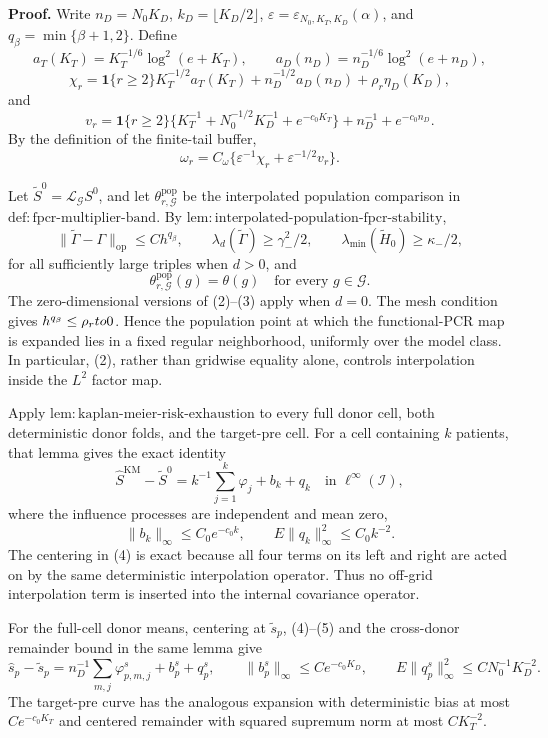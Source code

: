 \textbf{Proof.}
Write \(n_D=N_0K_D\), \(k_D=\lfloor K_D/2\rfloor\),
\(\varepsilon=\varepsilon_{N_0,K_T,K_D}(\alpha)\), and
\(q_\beta=\min\{\beta+1,2\}\).  Define
\[
 a_T(K_T)=K_T^{-1/6}\log^2(e+K_T),
 \qquad
 a_D(n_D)=n_D^{-1/6}\log^2(e+n_D),
\]
\[
 \chi_r=\mathbf 1\{r\ge2\}K_T^{-1/2}a_T(K_T)
       +n_D^{-1/2}a_D(n_D)+\rho_r\eta_D(K_D),
\]
and
\[
 v_r=\mathbf 1\{r\ge2\}
 \{K_T^{-1}+N_0^{-1/2}K_D^{-1}+e^{-c_0K_T}\}
 +n_D^{-1}+e^{-c_0n_D}.
\]
By the definition of the finite-tail buffer,
\[
 \omega_r=C_\omega\{\varepsilon^{-1}\chi_r
                   +\varepsilon^{-1/2}v_r\}.                 \tag{1}
\]

Let \(\widetilde S^0=\mathcal L_{\mathcal G}S^0\), and let
\(\theta^{\mathrm{pop}}_{r,\mathcal G}\) be the interpolated population
comparison in \(\mathrm{def:fpcr\mbox{-}multiplier\mbox{-}band}\).  By
\(\mathrm{lem:interpolated\mbox{-}population\mbox{-}fpcr\mbox{-}stability}\),
\[
 \|\widetilde\Gamma-\Gamma\|_{\mathrm{op}}
 \le C h^{q_\beta},
 \qquad
 \lambda_d(\widetilde\Gamma)\ge\gamma_-^2/2,
 \qquad
 \lambda_{\min}(\widetilde H_0)\ge\kappa_-/2,              \tag{2}
\]
for all sufficiently large triples when \(d>0\), and
\[
 \theta^{\mathrm{pop}}_{r,\mathcal G}(g)=\theta(g)
 \quad\text{for every }g\in\mathcal G.                     \tag{3}
\]
The zero-dimensional versions of (2)--(3) apply when \(d=0\).  The mesh
condition gives \(h^{q_\beta}\le\rho_r\\to0\).  Hence the population point
at which the functional-PCR map is expanded lies in a fixed regular
neighborhood, uniformly over the model class.  In particular, (2), rather
than gridwise equality alone, controls interpolation inside the \(L^2\)
factor map.

Apply
\(\mathrm{lem:kaplan\mbox{-}meier\mbox{-}risk\mbox{-}exhaustion}\) to every
full donor cell, both deterministic donor folds, and the target-pre cell.
For a cell containing \(k\) patients, that lemma gives the exact identity
\[
 \widehat S^{\mathrm{KM}}-\widetilde S^0
 =k^{-1}\sum_{j=1}^k\varphi_j+b_k+q_k
 \quad\text{in }\ell^\infty(\mathcal I),                   \tag{4}
\]
where the influence processes are independent and mean zero,
\[
 \|b_k\|_\infty\le C_0e^{-c_0k},
 \qquad
 E\|q_k\|_\infty^2\le C_0k^{-2}.                           \tag{5}
\]
The centering in (4) is exact because all four terms on its left and right
are acted on by the same deterministic interpolation operator.  Thus no
off-grid interpolation term is inserted into the internal covariance
operator.

For the full-cell donor means, centering at \(\widetilde s_p\), (4)--(5)
and the cross-donor remainder bound in the same lemma give
\[
 \widehat s_p-\widetilde s_p
 =n_D^{-1}\sum_{m,j}\varphi^s_{p,m,j}+b^s_p+q^s_p,
 \qquad
 \|b^s_p\|_\infty\le C e^{-c_0K_D},
 \qquad
 E\|q^s_p\|_\infty^2\le C N_0^{-1}K_D^{-2}.                \tag{6}
\]
The target-pre curve has the analogous expansion with deterministic bias
at most \(Ce^{-c_0K_T}\) and centered remainder with squared supremum norm
at most \(CK_T^{-2}\).

